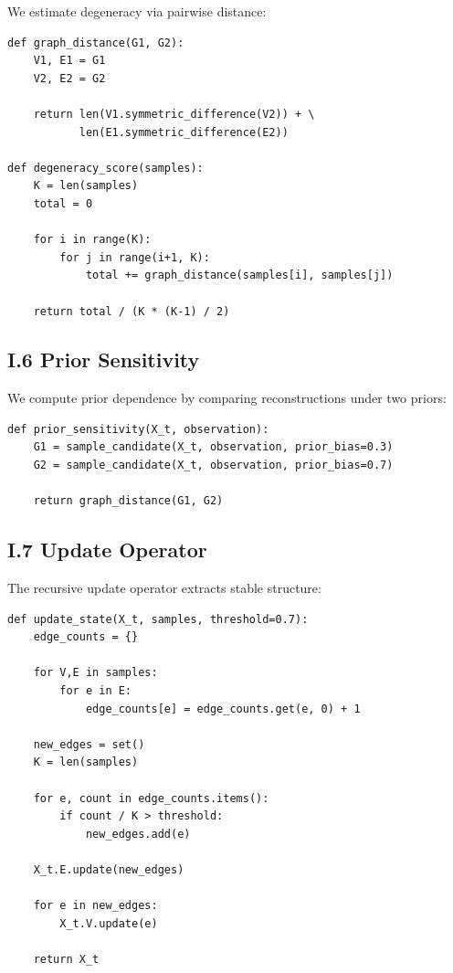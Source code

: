 \documentclass[12pt, oneside]{article}
\theoremstyle{plain}
\theoremstyle{definition}
\theoremstyle{remark}
\begin{document}
We estimate degeneracy via pairwise distance:

\begin{verbatim}
def graph_distance(G1, G2):
    V1, E1 = G1
    V2, E2 = G2

    return len(V1.symmetric_difference(V2)) + \
           len(E1.symmetric_difference(E2))

def degeneracy_score(samples):
    K = len(samples)
    total = 0

    for i in range(K):
        for j in range(i+1, K):
            total += graph_distance(samples[i], samples[j])

    return total / (K * (K-1) / 2)
\end{verbatim}

\subsection{I.6 Prior Sensitivity}

We compute prior dependence by comparing reconstructions under two priors:

\begin{verbatim}
def prior_sensitivity(X_t, observation):
    G1 = sample_candidate(X_t, observation, prior_bias=0.3)
    G2 = sample_candidate(X_t, observation, prior_bias=0.7)

    return graph_distance(G1, G2)
\end{verbatim}

\subsection{I.7 Update Operator}

The recursive update operator extracts stable structure:

\begin{verbatim}
def update_state(X_t, samples, threshold=0.7):
    edge_counts = {}

    for V,E in samples:
        for e in E:
            edge_counts[e] = edge_counts.get(e, 0) + 1

    new_edges = set()
    K = len(samples)

    for e, count in edge_counts.items():
        if count / K > threshold:
            new_edges.add(e)

    X_t.E.update(new_edges)

    for e in new_edges:
        X_t.V.update(e)

    return X_t
\end{verbatim}
\end{document}
